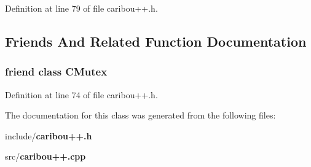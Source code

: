 Definition at line 79 of file caribou++.\+h.



\subsection{Friends And Related Function Documentation}
\subsubsection[{C\+Mutex}]{\setlength{\rightskip}{0pt plus 5cm}friend class {\bf C\+Mutex}\hspace{0.3cm}{\ttfamily [friend]}}\label{class_c_a_r_i_b_o_u_1_1_c_caribou_main_thread_a5c4fbf524d17a38ae855309d3f525269}


Definition at line 74 of file caribou++.\+h.



The documentation for this class was generated from the following files\+:\begin{DoxyCompactItemize}
\item 
include/{\bf caribou++.\+h}\item 
src/{\bf caribou++.\+cpp}\end{DoxyCompactItemize}
